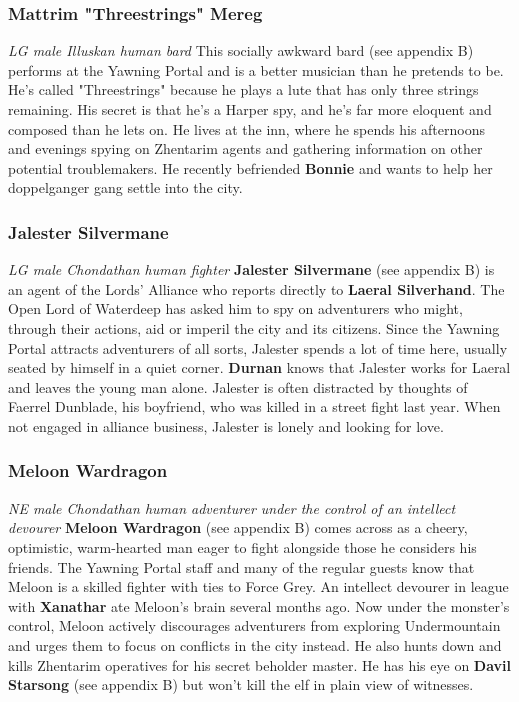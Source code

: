 \documentclass[10pt,a4paper,twoside,twocolumn,openany,nodeprecatedcode]{dndbook}
\begin{document}
\subsubsection{Mattrim "Threestrings" Mereg}
\textit{LG male Illuskan human bard}
This socially awkward bard (see appendix B) performs at the Yawning Portal and is a better musician than he pretends to be. He's called "Threestrings" because he plays a lute that has only three strings remaining. His secret is that he's a Harper spy, and he's far more eloquent and composed than he lets on. He lives at the inn, where he spends his afternoons and evenings spying on Zhentarim agents and gathering information on other potential troublemakers. He recently befriended \textbf{Bonnie} and wants to help her doppelganger gang settle into the city.
\subsubsection{Jalester Silvermane}
\textit{LG male Chondathan human fighter}
\textbf{Jalester Silvermane} (see appendix B) is an agent of the Lords' Alliance who reports directly to \textbf{Laeral Silverhand}. The Open Lord of Waterdeep has asked him to spy on adventurers who might, through their actions, aid or imperil the city and its citizens. Since the Yawning Portal attracts adventurers of all sorts, Jalester spends a lot of time here, usually seated by himself in a quiet corner. \textbf{Durnan} knows that Jalester works for Laeral and leaves the young man alone.
Jalester is often distracted by thoughts of Faerrel Dunblade, his boyfriend, who was killed in a street fight last year. When not engaged in alliance business, Jalester is lonely and looking for love.
\subsubsection{Meloon Wardragon}
\textit{NE male Chondathan human adventurer under the control of an intellect devourer}
\textbf{Meloon Wardragon} (see appendix B) comes across as a cheery, optimistic, warm-hearted man eager to fight alongside those he considers his friends. The Yawning Portal staff and many of the regular guests know that Meloon is a skilled fighter with ties to Force Grey.
An intellect devourer in league with \textbf{Xanathar} ate Meloon's brain several months ago. Now under the monster's control, Meloon actively discourages adventurers from exploring Undermountain and urges them to focus on conflicts in the city instead. He also hunts down and kills Zhentarim operatives for his secret beholder master. He has his eye on \textbf{Davil Starsong} (see appendix B) but won't kill the elf in plain view of witnesses.
\end{document}
